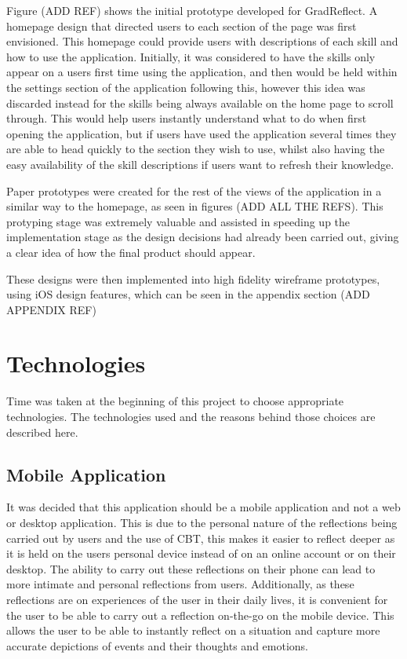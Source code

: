 \documentclass{l4proj}
\begin{document}
Figure (ADD REF) shows the initial prototype developed for GradReflect. A homepage design that directed users to each section of the page was first envisioned. 
This homepage could provide users with descriptions of each skill and how to use the application. Initially, it was considered to have the skills only appear 
on a users first time using the application, and then would be held within the settings section of the application following this, however this idea was discarded
instead for the skills being always available on the home page to scroll through. This would help users instantly understand what to do when
first opening the application, but if users have used the application several times they are able to head quickly to the section they wish to use, whilst also 
having the easy availability of the skill descriptions if users want to refresh their knowledge. 

Paper prototypes were created for the rest of the views of the application in a similar way to the homepage, as seen in figures (ADD ALL THE REFS). 
This protyping stage was extremely valuable and assisted in speeding up the implementation stage as the design decisions had already been carried out, 
giving a clear idea of how the final product should appear. 

These designs were then implemented into high fidelity wireframe prototypes, using iOS design features, which can be seen in the appendix section (ADD APPENDIX
REF)


\section{Technologies}
Time was taken at the beginning of this project to choose appropriate technologies. The technologies used and the reasons behind those 
choices are described here.

\subsection{Mobile Application}

It was decided that this application should be a mobile application and not a web or desktop application. This is due to the personal nature of the reflections
being carried out by users and the use of CBT, this makes it easier to reflect deeper as it is held on the users personal device instead of on an online account
or on their desktop. The ability to carry out these reflections on their phone can lead to more intimate and personal reflections from users.
Additionally, as these reflections are on experiences of the user in their daily lives, it is convenient for the user to be able to carry out a reflection on-the-go
on the mobile device. This allows the user to be able to instantly reflect on a situation and capture more accurate depictions of events and their thoughts 
and emotions.
\end{document}

